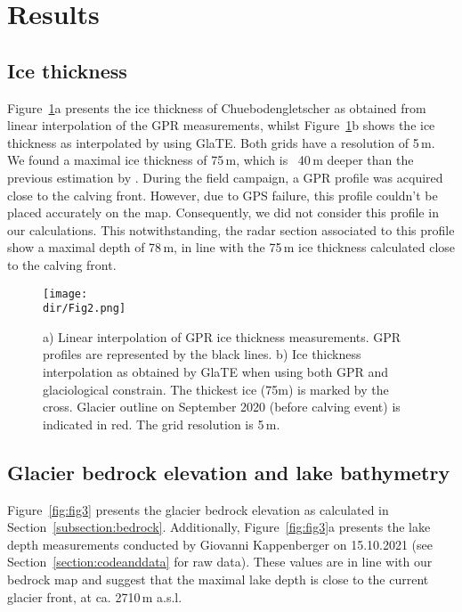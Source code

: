 \section{Results}

\subsection{Ice thickness}

Figure~\ref{fig:fig2}a presents the ice thickness of Chuebodengletscher as obtained from linear interpolation of the GPR measurements, whilst Figure~\ref{fig:fig2}b shows the ice thickness as interpolated by using GlaTE. Both grids have a resolution of 5\,m. We found a maximal ice thickness of 75\,m, which is ~40\,m deeper than the previous estimation by \citet{Grab&al2021}. During the field campaign, a GPR profile was acquired close to the calving front. However, due to GPS failure, this profile couldn't be placed accurately on the map. Consequently, we did not consider this profile in our calculations. This notwithstanding, the radar section associated to this profile show a maximal depth of 78\,m, in line with the 75\,m ice thickness calculated close to the calving front.

\begin{figure}[h!]
\centering
\texttt{[image: \\dir/Fig2.png]}
\caption{a) Linear interpolation of GPR ice thickness measurements. GPR profiles are represented by the black lines. b) Ice thickness interpolation as obtained by GlaTE when using both GPR and glaciological constrain. The thickest ice (75m) is marked by the cross. Glacier outline on September 2020 (before calving event) is indicated in red. The grid resolution is 5\,m.}
\label{fig:fig2}
\end{figure}

\subsection{Glacier bedrock elevation and lake bathymetry}


Figure~\ref{fig:fig3} presents the glacier bedrock elevation as calculated in Section~\ref{subsection:bedrock}. Additionally, Figure~\ref{fig:fig3}a presents the lake depth measurements conducted by Giovanni Kappenberger on 15.10.2021 (see Section~\ref{section:codeanddata} for raw data). These values are in line with our bedrock map and suggest that the maximal lake depth is close to the current glacier front, at ca. 2710\,m a.s.l. 

